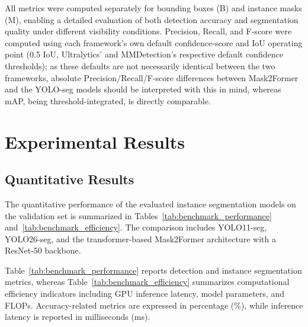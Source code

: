 \documentclass[runningheads]{llncs}
\begin{document}
All metrics were computed separately for bounding boxes (B) and instance masks
(M), enabling a detailed evaluation of both detection accuracy and segmentation
quality under different visibility conditions. Precision, Recall, and F-score
were computed using each framework's own default confidence-score and
IoU operating point (0.5 IoU, Ultralytics' and MMDetection's respective
default confidence thresholds); as these defaults are not necessarily
identical between the two frameworks, absolute Precision/Recall/F-score
differences between Mask2Former and the YOLO-seg models should be interpreted
with this in mind, whereas mAP, being threshold-integrated, is directly
comparable.

\section{Experimental Results}
\label{Sec::Results}

\subsection{Quantitative Results}

The quantitative performance of the evaluated instance segmentation models on
the validation set is summarized in Tables~\ref{tab:benchmark_performance}
and~\ref{tab:benchmark_efficiency}. The comparison includes YOLO11-seg,
YOLO26-seg, and the transformer-based Mask2Former architecture with a
ResNet-50 backbone.

Table~\ref{tab:benchmark_performance} reports detection and instance
segmentation metrics, whereas Table~\ref{tab:benchmark_efficiency}
summarizes computational efficiency indicators including GPU inference latency,
model parameters, and FLOPs. Accuracy-related metrics are expressed in
percentage (\%), while inference latency is reported in milliseconds (ms).
\end{document}
